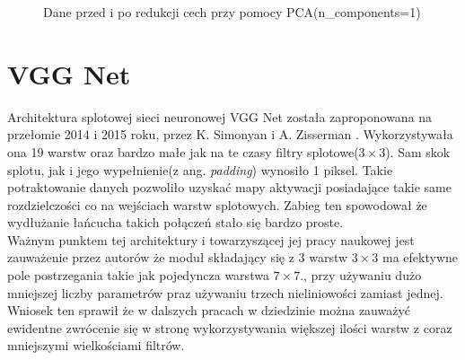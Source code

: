 \begin{figure}[h!]
	\centering
	\qquad
	\caption{Dane przed i po redukcji cech przy pomocy PCA(n\_components=1)}
	\label{fig:pca}
\end{figure}

\section{VGG Net}

Architektura splotowej sieci neuronowej VGG Net została zaproponowana na przełomie 2014 i 2015 roku, przez K.  Simonyan i A. Zisserman \cite{vgg}. Wykorzystywała ona 19 warstw oraz bardzo małe jak na te czasy filtry splotowe($3 \times 3$). Sam skok splotu, jak i jego wypełnienie(z ang. \textit{padding}) wynosiło 1 piksel. Takie potraktowanie danych pozwoliło uzyskać mapy aktywacji posiadające takie same rozdzielczości co na wejściach warstw splotowych. Zabieg ten spowodował że wydłużanie łańcucha takich połączeń stało się bardzo proste. \\

Ważnym punktem tej architektury i towarzyszącej jej pracy naukowej \cite{vgg} jest zauważenie przez autorów że moduł składający się z 3 warstw $3 \times 3$ ma efektywne pole postrzegania takie jak pojedyncza warstwa $7 \times 7$., przy używaniu dużo mniejszej liczby parametrów praz używaniu trzech nieliniowości zamiast jednej. Wniosek ten sprawił że w dalszych pracach w dziedzinie można zauważyć ewidentne zwrócenie się w stronę wykorzystywania większej ilości warstw z coraz mniejszymi wielkościami filtrów.

